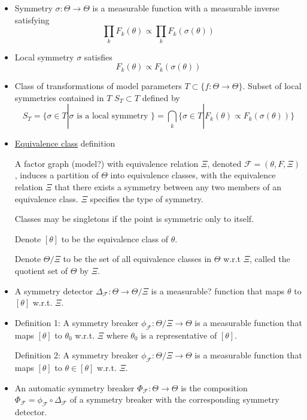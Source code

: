 \documentclass{article}
\begin{document}
\begin{itemize}

\item
Symmetry $\sigma:\Theta\rightarrow\Theta$ is a measurable function with a measurable inverse satisfying
\[
\prod_kF_k(\theta)\propto\prod_kF_k\left(\sigma(\theta)\right)
\]

\item
Local symmetry $\sigma$ satisfies
\[
F_k(\theta) \propto F_k\left(\sigma(\theta)\right)
\]

\item
Class of transformations of model parameters $T\subset\{f:\Theta\rightarrow\Theta\}$. Subset of local symmetries contained in $T$ $S_T\subset T$ defined by
\[
S_T=\{\sigma\in T|\sigma \text{ is a local symmetry }\} = \bigcap_k\{\sigma\in T | F_k(\theta)\propto F_k\left(\sigma(\theta)\right)\}
\]

\item
\href{https://en.wikipedia.org/wiki/Equivalence_class}{Equivalence class} definition

A factor graph (model?) with equivalence relation $\Xi$, denoted $\mathcal{F}=(\theta,F,\Xi)$, induces a partition of $\Theta$ into equivalence classes, with the equivalence relation $\Xi$ that there exists a symmetry between any two members of an equivalence class. $\Xi$ specifies the type of symmetry.

Classes may be singletons if the point is symmetric only to itself.

Denote $[\theta]$ to be the equivalence class of $\theta$.

Denote $\Theta/\Xi$ to be the set of all equivalence classes in $\Theta$ w.r.t $\Xi$, called the quotient set of $\Theta$ by $\Xi$.

\item
A symmetry detector $\Delta_\mathcal{F}:\Theta\rightarrow\Theta/\Xi$ is a measurable? function that maps $\theta$ to $[\theta]$ w.r.t. $\Xi$.

\item
Definition 1: A symmetry breaker $\phi_\mathcal{F}:\Theta/\Xi\rightarrow\Theta$ is a measurable function that maps $[\theta]$ to $\theta_0$ w.r.t. $\Xi$ where $\theta_0$ is a representative of $[\theta]$.

Definition 2: A symmetry breaker $\phi_\mathcal{F}:\Theta/\Xi\rightarrow\Theta$ is a measurable function that maps $[\theta]$ to $\theta\in[\theta]$ w.r.t. $\Xi$.

\item
An automatic symmetry breaker $\Phi_\mathcal{F}:\Theta\rightarrow\Theta$ is the composition $\Phi_\mathcal{F}=\phi_\mathcal{F}\circ\Delta_\mathcal{F}$ of a symmetry breaker with the corresponding symmetry detector.


\end{itemize}
\end{document}
